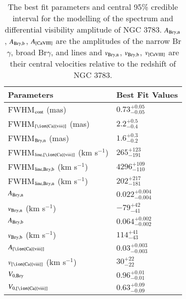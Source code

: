 \begin{table}
\centering
\renewcommand{\arraystretch}{1.5}
\begin{tabular}{p{} | >{\centering\arraybackslash}p{}}
\hline\hline
Parameters                                & Best Fit Values      \\ 
\hline
FWHM$_{\rm cont}$ (mas)                   & $0.73_{-0.05}^{+0.05}$    \\
FWHM$_{\rm [\ion{Ca}{viii}]}$  (mas)                   & $2.2_{-0.4}^{+0.5}$      \\
FWHM$_{\rm Br\gamma,n}$  (mas)                   & $1.6_{-0.2}^{+0.3}$      \\
FWHM$_{\rm line,[\ion{Ca}{viii}]}$ (km s$^{-1}$)       & $265_{-191}^{+123}$ \\
FWHM$_{\rm line,Br\gamma,b}$ (km s$^{-1}$)       & $4296_{-110}^{+109}$     \\
FWHM$_{\rm line,Br\gamma,n}$ (km s$^{-1}$)       & $202_{-181}^{+217}$ \\
$A_{\rm Br\gamma,n}$                    & $0.022_{-0.004}^{+0.004}$       \\
$v_{\rm Br\gamma,n}$ (km s$^{-1}$)       & $-79_{-41}^{+42}$    \\
$A_{\rm Br\gamma,b}$                    & $0.064_{-0.002}^{+0.002}$       \\
$v_{\rm Br\gamma,b}$ (km s$^{-1}$)       & $114_{-43}^{+41}$      \\ 
$A_{\rm [\ion{Ca}{viii}]}$                        & $0.03_{-0.003}^{+0.003}$       \\
$v_{\rm [\ion{Ca}{viii}]}$  (km s$^{-1}$)          & $30_{-22}^{+22}$     \\
$V_{0,\rm{Br\gamma}}$                     & $0.96_{-0.01}^{+0.01}$    \\
$V_{0,\rm{[\ion{Ca}{viii}]}}$                     & $0.63_{-0.09}^{+0.09}$    \\
\hline\hline
\end{tabular}
\caption{The best fit parameters and central 95\% credible interval 
for the modelling of the spectrum and differential visibility amplitude of NGC 3783.
$A_{\rm Br\gamma,n}$, $A_{\rm Br\gamma,b}$, $A_{\rm [CaVIII]}$ are the amplitudes of the narrow Br$\gamma$, broad Br$\gamma$, and \caviii{} lines and $v_{\rm Br\gamma,n}$, $v_{\rm Br\gamma,b}$, $v_{\rm [CaVIII]}$ are their central velocities relative to the redshift of NGC 3783.
}
\label{tab:clr}
\end{table}
